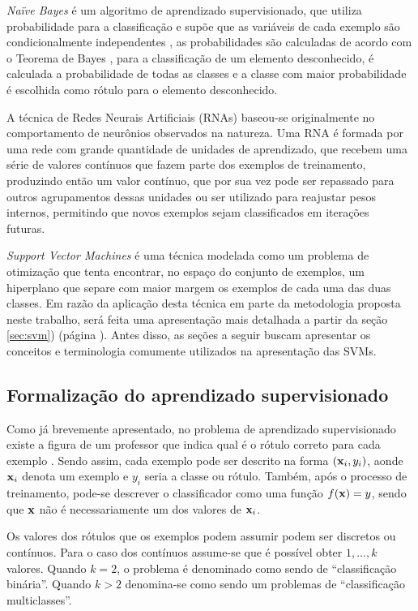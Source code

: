 \emph{Naïve Bayes} é um algoritmo de aprendizado supervisionado, que
utiliza probabilidade para a classificação e supõe que as variáveis de cada
exemplo são condicionalmente independentes \cite{de-categorizacao}, as
probabilidades são calculadas de acordo com o Teorema de Bayes
\cite{kim2003poisson}, para a classificação de um elemento desconhecido, é
calculada a probabilidade de todas as classes e a classe com maior
probabilidade é escolhida como rótulo para o elemento desconhecido.
~\cite{pardo2002aprendizado}

A técnica de Redes Neurais Artificiais (RNAs) baseou-se originalmente no comportamento de neurônios observados na natureza. Uma RNA é formada por uma rede com grande quantidade de unidades de aprendizado, que recebem uma série de valores contínuos que fazem parte dos exemplos de treinamento, produzindo então um valor contínuo, que por sua vez pode ser repassado para outros agrupamentos dessas unidades ou ser utilizado para reajustar pesos internos, permitindo que novos exemplos sejam classificados em iterações futuras.~\cite[p. 81-86]{mitchell1997machine}

\emph{Support Vector Machines} é uma técnica modelada como um problema de otimização que tenta encontrar, no espaço do conjunto de exemplos, um hiperplano que separe com maior margem os exemplos de cada uma das duas classes. Em razão da aplicação desta técnica em parte da metodologia proposta neste trabalho, será feita uma apresentação mais detalhada a partir da seção \ref{sec:svm}) (página \pageref{sec:svm}). Antes disso, as seções a seguir buscam apresentar os conceitos e terminologia comumente utilizados na apresentação das SVMs.

\subsection{Formalização do aprendizado supervisionado}

Como já brevemente apresentado, no problema de aprendizado supervisionado existe a figura de um professor que indica qual é o rótulo correto para cada exemplo . Sendo assim, cada exemplo pode ser descrito na forma $(\mathbf{x}_i, y_i)$, aonde $\mathbf{x}_i$ denota um exemplo e $y_i$ seria a classe ou rótulo. Também, após o processo de treinamento, pode-se descrever o classificador como uma função $f(\mathbf{x}) = y$, sendo que $\mathbf{x}$ não é necessariamente um dos valores de $\mathbf{x}_i$.

Os valores dos rótulos que os exemplos podem assumir podem ser discretos ou contínuos. Para o caso dos contínuos assume-se que é possível obter $1,\dotsc,k$ valores. Quando $k = 2$, o problema é denominado como sendo de ``classificação binária''. Quando $k > 2$ denomina-se como sendo um problemas de ``classificação multiclasses''.

